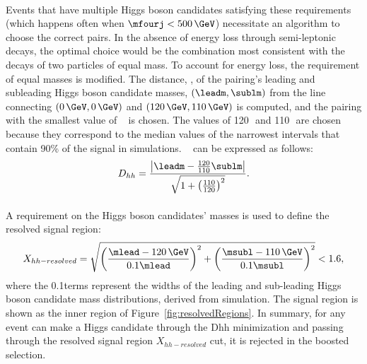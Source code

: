 \paragraph{}
Events that have multiple Higgs boson candidates satisfying these requirements (which happens often when $\mfourj < 500\,\GeV$) necessitate an algorithm to choose the correct pairs. 
In the absence of energy loss through semi-leptonic decays, the optimal choice would be the combination most consistent with the decays of two particles of equal mass.
To account for energy loss, the requirement of equal masses is modified. 
The distance, \Dhh, of the pairing's leading and subleading Higgs boson candidate masses, $\left(\leadm, \sublm\right)$ from the line connecting $\left(0\,\GeV, 0\,\GeV\right)$ and $\left(120\,\GeV, 110\,\GeV\right)$ is computed, and the pairing with the smallest value of \Dhh~ is chosen.
The values of 120\,\GeV\, and 110\,\GeV\, are chosen because they correspond to the median values of the narrowest intervals that contain 90\% of the signal in simulations.%
\Dhh~ can be expressed as follows:
\begin{equation}
D_{hh} = \frac{\left|\leadm - \frac{120}{110}\sublm\right|}{\sqrt{1+\left(\frac{110}{120}\right)^{2}}}.
\end{equation}

\paragraph{}
A requirement on the Higgs boson candidates' masses is used to define the resolved signal region:
\begin{equation}
X_{hh-resolved} = \sqrt{\left(\frac{\mlead - 120\,\GeV}{0.1\mlead}\right)^2 + \left(\frac{\msubl - 110\,\GeV}{0.1\msubl}\right)^2} < 1.6,
\label{eqn:resolvedXhh}
\end{equation}
where the 0.1\mtwoj terms represent the widths of the leading and sub-leading Higgs boson candidate mass distributions, derived from simulation. The signal region is shown as the inner region of Figure~\ref{fig:resolvedRegions}. In summary, for any event can make a Higgs candidate through the Dhh minimization and passing through the resolved signal region $X_{hh-resolved}$ cut, it is rejected in the boosted selection.


